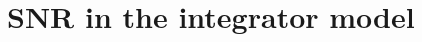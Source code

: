 \documentclass[conference]{IEEEtran}
\providecommand{\v}{}
\renewcommand{\v}[1]{\underline{#1}}
\providecommand{\vhat}{}
\renewcommand{\vhat}[1]{\underline{\hat{#1}}}
\DeclarePairedDelimiter\abs{\lvert}{\rvert}
\DeclarePairedDelimiter\norm{\lVert}{\rVert}
\newcommand{\Phiorho}{\Phi\!\circ\!\rho}
\begin{document}







\newpage

\appendices

\section{SNR in the integrator model}
\label{app:integrator-snr}
\end{document}
